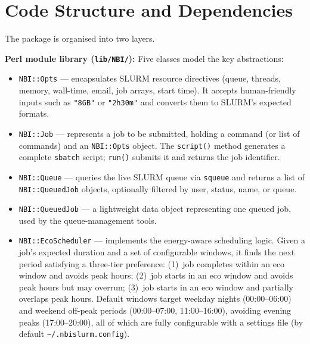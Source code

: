 \documentclass[11pt,a4paper]{article}
\begin{document}
\section{Code Structure and Dependencies}

The package is organised into two layers.

\textbf{Perl module library (\texttt{lib/NBI/}):} Five classes model the key abstractions:

\begin{itemize}
  \item \texttt{NBI::Opts} --- encapsulates SLURM resource directives (queue, threads, memory,
        wall-time, email, job arrays, start time).
        It accepts human-friendly inputs such as \texttt{"8GB"} or \texttt{"2h30m"} and
        converts them to SLURM's expected formats.

  \item \texttt{NBI::Job} --- represents a job to be submitted, holding a command (or list of
        commands) and an \texttt{NBI::Opts} object.
        The \texttt{script()} method generates a complete \texttt{sbatch} script;
        \texttt{run()} submits it and returns the job identifier.

  \item \texttt{NBI::Queue} --- queries the live SLURM queue via \texttt{squeue} and returns
        a list of \texttt{NBI::QueuedJob} objects, optionally filtered by user, status, name,
        or queue.

  \item \texttt{NBI::QueuedJob} --- a lightweight data object representing one queued job,
        used by the queue-management tools.

  \item \texttt{NBI::EcoScheduler} --- implements the energy-aware scheduling logic.
        Given a job's expected duration and a set of configurable windows, it finds the next
        period satisfying a three-tier preference:
        (1)~job completes within an eco window and avoids peak hours;
        (2)~job starts in an eco window and avoids peak hours but may overrun;
        (3)~job starts in an eco window and partially overlaps peak hours.
        Default windows target weekday nights (00:00--06:00) and weekend off-peak periods
        (00:00--07:00, 11:00--16:00), avoiding evening peaks (17:00--20:00), all of which are
        fully configurable with a settings file (by default \texttt{\textasciitilde/.nbislurm.config}).
\end{itemize}
\end{document}

